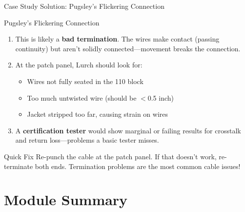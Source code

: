 \documentclass[aspectratio=169]{beamer}  %
\begin{document}
\begin{frame}{Case Study Solution: Pugsley's Flickering Connection}
    \begin{casesolution}{Pugsley's Flickering Connection}
        \begin{enumerate}
            \item This is likely a \textbf{bad termination}. The wires make contact (passing continuity) but aren't solidly connected---movement breaks the connection.
            \item At the patch panel, Lurch should look for:
                \begin{itemize}
                    \item Wires not fully seated in the 110 block
                    \item Too much untwisted wire (should be $<$0.5 inch)
                    \item Jacket stripped too far, causing strain on wires
                \end{itemize}
            \item A \textbf{certification tester} would show marginal or failing results for crosstalk and return loss---problems a basic tester misses.
        \end{enumerate}
    \end{casesolution}
    
    \vspace{0.3em}
    \begin{alertblock}{Quick Fix}
        Re-punch the cable at the patch panel. If that doesn't work, re-terminate both ends. Termination problems are the most common cable issues!
    \end{alertblock}
\end{frame}

\section*{Module Summary}
\end{document}

